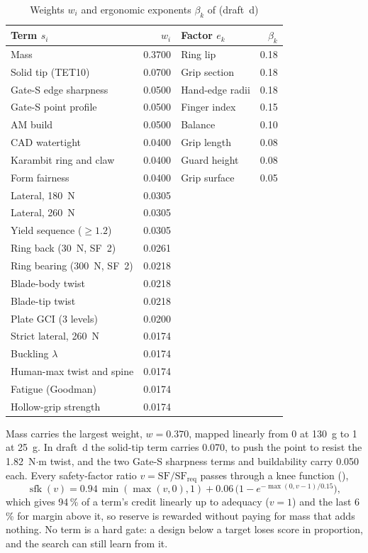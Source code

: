 \begin{table}[t]
\caption{Weights $w_i$ and ergonomic exponents $\beta_k$ of  (draft~d)}\label{tab:weights}
\centering
\setlength{\tabcolsep}{3.2pt}
\begin{tabular}{@{}lrlr@{}}
\toprule
Term $s_i$ & $w_i$ & Factor $e_k$ & $\beta_k$ \\
\midrule
Mass & 0.3700 & Ring lip & 0.18 \\
Solid tip (TET10) & 0.0700 & Grip section & 0.18 \\
Gate-S edge sharpness & 0.0500 & Hand-edge radii & 0.18 \\
Gate-S point profile & 0.0500 & Finger index & 0.15 \\
AM build & 0.0500 & Balance & 0.10 \\
CAD watertight & 0.0400 & Grip length & 0.08 \\
Karambit ring and claw & 0.0400 & Guard height & 0.08 \\
Form fairness & 0.0400 & Grip surface & 0.05 \\
Lateral, 180~N & 0.0305 & & \\
Lateral, 260~N & 0.0305 & & \\
Yield sequence ($\ge 1.2$) & 0.0305 & & \\
Ring back (30~N, SF~2) & 0.0261 & & \\
Ring bearing (300~N, SF~2) & 0.0218 & & \\
Blade-body twist & 0.0218 & & \\
Blade-tip twist & 0.0218 & & \\
Plate GCI (3 levels) & 0.0200 & & \\
Strict lateral, 260~N & 0.0174 & & \\
Buckling $\lambda$ & 0.0174 & & \\
Human-max twist and spine & 0.0174 & & \\
Fatigue (Goodman) & 0.0174 & & \\
Hollow-grip strength & 0.0174 & & \\
\bottomrule
\end{tabular}
\end{table}

Mass carries the largest weight, $w = 0.370$, mapped linearly from 0 at 130~g to 1 at 25~g. In draft~d the solid-tip term
carries 0.070, to push the point to resist the 1.82~N$\cdot$m twist, and the two Gate-S sharpness terms and buildability
carry 0.050 each. Every safety-factor ratio $v = \mathrm{SF}/\mathrm{SF}_\mathrm{req}$ passes through a knee function
(),
\begin{equation}
\operatorname{sfk}(v) = 0.94\,\min(\max(v, 0), 1) + 0.06\,\bigl(1 - e^{-\max(0, v - 1)/0.15}\bigr),
\end{equation}
which gives 94\,\% of a term's credit linearly up to adequacy ($v = 1$) and the last 6\,\% for margin above it, so
reserve is rewarded without paying for mass that adds nothing. No term is a hard gate: a design below a target loses
score in proportion, and the search can still learn from it.

